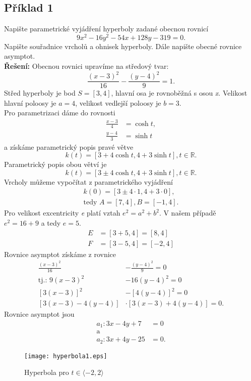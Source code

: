 			\subsection*{Příklad 1}
			Napište parametrické vyjádření hyperboly zadané obecnou rovnicí
			$$9x^2-16y^2-54x+128y-319=0.$$
			Napište souřadnice vrcholů a ohnisek hyperboly. Dále napište obecné rovnice asymptot. \\[10pt]
			\textbf{Řešení:} Obecnou rovnici upravíme na středový tvar:
			$$\frac{(x-3)^2}{16}-\frac{(y-4)^2}{9}=1.$$
			Střed hyperboly je bod $S=[3,4]$, hlavní osa je rovnoběžná s osou \textit{x}. Velikost hlavní poloosy
			je $a=4$, velikost vedlejší poloosy je $b=3$. \\
			Pro parametrizaci dáme do rovnosti \\
			\begin{align*}
				\frac{x-3}{4} & =\cosh{t}, \\ \frac{y-4}{3}&=\sinh{t}
			\end{align*}
			a získáme parametrický popis pravé větve
			$$k(t)=[3+4\cosh{t}, 4+3\sinh{t}], t \in \mathbb{R}\text{.}$$
			Parametrický popis obou větví je
			$$k(t)=[3\pm4\cosh{t}, 4+3\sinh{t}], t \in \mathbb{R}\text{.}$$
			Vrcholy můžeme vypočítat z parametrického vyjádření
			\begin{align*}
				k(0)=[3\pm4\cdot1, 4+3\cdot0] \text{,} \\
				\text{tedy }                           
				A=[7, 4], B=[-1, 4].                   
			\end{align*}
			Pro velikost excentricity \textit{e} platí vztah $e^2=a^2+b^2$. V našem případě \\ $e^2=16+9$
			a tedy $e=5$.
			\begin{align*}
				E & =[3+5, 4]=[8, 4] \\
				F & =[3-5, 4]=[-2,4] 
			\end{align*}
			Rovnice asymptot získáme z rovnice
			\begin{align*}
				\frac{(x-3)^2}{16}    & -\frac{(y-4)^2}{9}=0      \\
				\text{tj.: } 9(x-3)^2 & -16(y-4)^2=0              \\
				[3(x-3)]^2            & -[4(y-4)]^2=0             \\
				[3(x-3)-4(y-4)]       & \cdot[3(x-3)+4(y-4)] = 0. 
			\end{align*}
			Rovnice asymptot jsou
			\begin{align*}
				a_1: 3x-4y+7  & =0  \\
				\text{a}\\
				a_2: 3x+4y-25 & =0. 
			\end{align*}
			\begin{figure}[H]
				\centering
				\texttt{[image: hyperbola1.eps]}
				\caption{Hyperbola pro $t \in \langle-2, 2\rangle$}
									
			\end{figure}
			\clearpage
